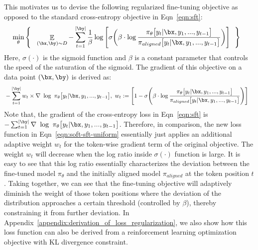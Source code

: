 This motivates us to devise the following regularized fine-tuning objective as opposed to the standard cross-entropy objective in Eqn~\ref{eqn:sft}:
\begin{align}
    & \min_{\theta} \Bigg\{ \ \ \mathop{\mathbb E}_{(\bx,\by)\sim D} -  \sum_{t=1}^{|\by|} \frac{1}{\beta} \log\Bigg[\sigma \bigg( \beta \cdot  \log \frac{\pi_{\theta}\big[y_t|\bx, y_1,...,y_{t-1}\big]}{\pi_{aligned}\big[y_t|\bx, y_1,...,y_{t-1}\big]}  \bigg)  \Bigg] \ \ \Bigg\}
\label{eqn:soft-sft-uniform}
\end{align}
Here, $\sigma(\cdot)$ is the sigmoid function and $\beta$ is a constant parameter that controls the speed of the saturation of the sigmoid. The gradient of this objective on a data point $(\bx, \by)$ is derived as:
\begin{align}
    &  -  \sum_{t=1}^{|\by|} w_t \times \nabla \ \log \ \pi_{\theta}\big[y_t|\bx, y_1,...,y_{t-1}\big],\ w_t := \Bigg[1 - \sigma\Bigg( \beta \cdot \log \frac{\pi_{\theta}\big[y_t|\bx, y_1,...,y_{t-1}\big]}{\pi_{aligned}\big[y_t|\bx, y_1,...,y_{t-1}\big]}\Bigg)\Bigg]
\end{align}
Note that, the gradient of the cross-entropy loss in Eqn~\ref{eqn:sft} is $-  \sum_{t=1}^{|\by|}  \nabla \ \log \ \pi_{\theta}\big[y_t|\bx, y_1,...,y_{t-1}\big]$. Therefore, in comparison, the new loss function in Eqn~\ref{eqn:soft-sft-uniform} essentially just applies an additional adaptive weight $w_t$ for the token-wise gradient term of the original objective. The weight $w_t$ will decrease when the log ratio inside $\sigma(\cdot)$ function is large. It is easy to see that this log ratio essentially characterizes the deviation between the fine-tuned model $\pi_{\theta}$ and the initially aligned model $\pi_{aligned}$ at the token position $t$. Taking together, we can see that the fine-tuning objective will adaptively diminish the weight of those token positions where the deviation of the distribution approaches a certain threshold (controlled by $\beta$), thereby constraining it from further deviation. In Appendix~\ref{appendix:derivation_of_loss_regularization}, we also show how this loss function can also be derived from a reinforcement learning optimization objective with KL divergence constraint.

